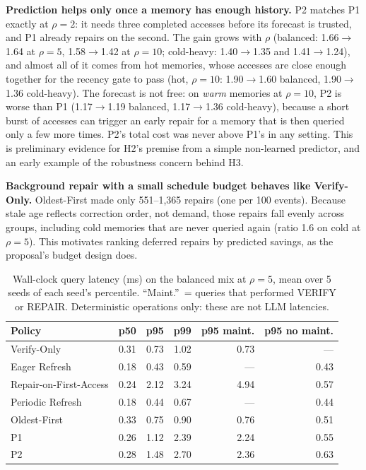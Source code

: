 \documentclass{article}
\begin{document}
\textbf{Prediction helps only once a memory has enough history.} P2 matches P1
exactly at $\rho=2$: it needs three completed accesses before its forecast is
trusted, and P1 already repairs on the second. The gain grows with $\rho$
(balanced: 1.66$\to$1.64 at $\rho=5$, 1.58$\to$1.42 at $\rho=10$;
cold-heavy: 1.40$\to$1.35 and 1.41$\to$1.24), and almost all of it comes from hot
memories, whose accesses are close enough together for the recency gate to
pass (hot, $\rho=10$: 1.90$\to$1.60 balanced, 1.90$\to$1.36 cold-heavy). The
forecast is not free: on \emph{warm} memories at $\rho=10$, P2 is worse than
P1 (1.17$\to$1.19 balanced, 1.17$\to$1.36 cold-heavy), because a short burst
of accesses can trigger an early repair for a memory that is then queried only
a few more times. P2's total cost was never above P1's in any setting. This is
preliminary evidence for H2's premise from a simple non-learned predictor, and
an early example of the robustness concern behind H3.

\textbf{Background repair with a small schedule budget behaves like Verify-Only.}
Oldest-First made only 551--1,365 repairs (one per 100 events). Because
stale age reflects correction order, not demand, those repairs fall evenly
across groups, including cold memories that are never queried again (ratio 1.6 on cold at $\rho=5$).
This motivates ranking deferred repairs by predicted savings, as the proposal's
budget design does.

\begin{table}[t]
\centering
\small
\caption{Wall-clock query latency (ms) on the balanced mix at $\rho=5$, mean
over 5 seeds of each seed's percentile. ``Maint.''\ = queries that performed
VERIFY or REPAIR. Deterministic operations only: these are not LLM latencies.}
\label{tab:latency}
\begin{tabular}{@{}lrrrrr@{}}
\toprule
Policy & p50 & p95 & p99 & p95 maint. & p95 no maint. \\
\midrule
Verify-Only            & 0.31 & 0.73 & 1.02 & 0.73 & --- \\
Eager Refresh          & 0.18 & 0.43 & 0.59 & ---  & 0.43 \\
Repair-on-First-Access & 0.24 & 2.12 & 3.24 & 4.94 & 0.57 \\
Periodic Refresh       & 0.18 & 0.44 & 0.67 & ---  & 0.44 \\
Oldest-First           & 0.33 & 0.75 & 0.90 & 0.76 & 0.51 \\
P1                     & 0.26 & 1.12 & 2.39 & 2.24 & 0.55 \\
P2                     & 0.28 & 1.48 & 2.70 & 2.36 & 0.63 \\
\bottomrule
\end{tabular}
\end{table}
\end{document}
